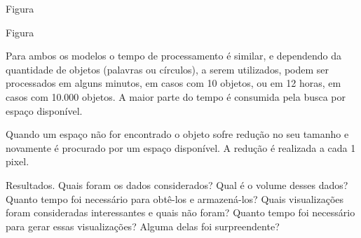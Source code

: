 \documentclass[12pt]{article}
\begin{document}
Figura


Figura



Para ambos os modelos o tempo de processamento é similar, e dependendo da quantidade de objetos (palavras ou círculos), a serem utilizados, podem ser processados em alguns minutos, em casos com 10 objetos, ou em 12 horas, em casos com 10.000 objetos. A maior parte do tempo é consumida pela busca por espaço disponível. 

Quando um espaço não for encontrado o objeto sofre redução no seu tamanho e novamente é procurado por um espaço disponível. A redução é realizada a cada 1 pixel. 




Resultados.
Quais foram os dados considerados? Qual é o volume desses dados? Quanto tempo foi
necessário para obtê-los e armazená-los? Quais visualizações foram consideradas interessantes e quais não
foram? Quanto tempo foi necessário para gerar essas visualizações? Alguma delas foi surpreendente?



\begin{thebibliography}{2}

\end{thebibliography}
\end{document}
